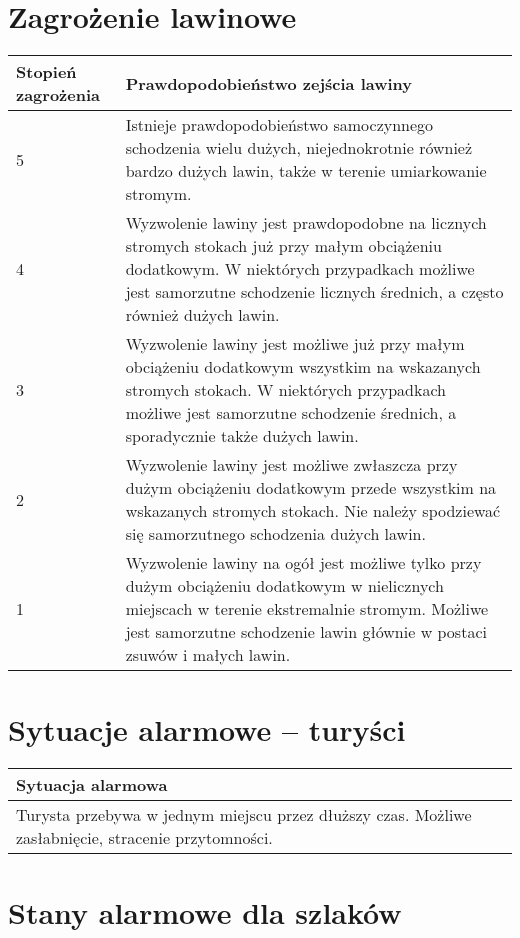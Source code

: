 \documentclass[a4paper,12pt]{article}
\begin{document}
\section{Zagrożenie lawinowe}
\begin{center}
    \begin{longtable}{ | l | p{10cm} |}
    \hline
    \textbf{Stopień zagrożenia} & \textbf{Prawdopodobieństwo zejścia lawiny}\\ \hline
    5 & Istnieje prawdopodobieństwo samoczynnego schodzenia wielu dużych, niejednokrotnie
również bardzo dużych lawin, także w terenie
umiarkowanie stromym. \\\hline
	4 & Wyzwolenie lawiny jest prawdopodobne na
licznych stromych stokach już przy małym
obciążeniu dodatkowym. W niektórych
przypadkach możliwe jest samorzutne
schodzenie licznych średnich, a często
również dużych lawin.\\\hline
	3 & Wyzwolenie lawiny jest możliwe już przy
małym obciążeniu dodatkowym wszystkim na
wskazanych stromych stokach. W niektórych
przypadkach możliwe jest samorzutne
schodzenie średnich, a sporadycznie także
dużych lawin.\\\hline
	2 & Wyzwolenie lawiny jest możliwe zwłaszcza
przy dużym obciążeniu dodatkowym przede
wszystkim na wskazanych stromych stokach.
Nie należy spodziewać się samorzutnego
schodzenia dużych lawin.\\\hline
	1 & Wyzwolenie lawiny na ogół jest możliwe tylko
przy dużym obciążeniu dodatkowym w
nielicznych miejscach w terenie ekstremalnie
stromym. Możliwe jest samorzutne schodzenie
lawin głównie w postaci zsuwów i małych
lawin. \\\hline
    \end{longtable}
\end{center}
\newpage
\section{Sytuacje alarmowe -- turyści}
\begin{center}
\begin{longtable}{ | p{15cm} | }
	\textbf{Sytuacja alarmowa}\\\hline
	Turysta przebywa w jednym miejscu przez
dłuższy czas. Możliwe zasłabnięcie, stracenie
przytomności.\\\hline
\end{longtable}
\end{center}
\newpage
\section{Stany alarmowe dla szlaków}
\end{document}
